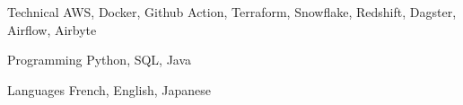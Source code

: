 

\begin{cvskills}

  \cvskill
    {Technical} %
    {AWS, Docker, Github Action, Terraform, Snowflake, Redshift, Dagster, Airflow, Airbyte } %

  \cvskill
    {Programming} %
    {Python, SQL, Java} %

  \cvskill
    {Languages} %
    {French, English, Japanese} %

\end{cvskills}
